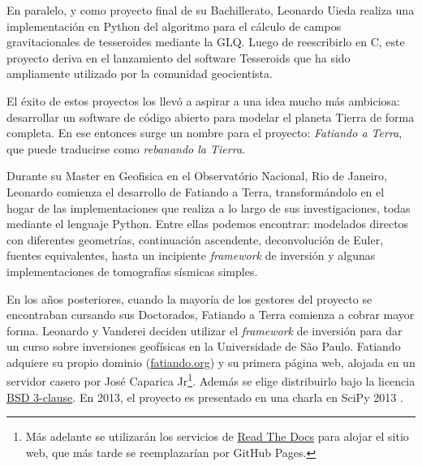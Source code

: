 En paralelo, y como proyecto final de su Bachillerato, Leonardo Uieda realiza
una implementación en Python del algoritmo para el cálculo de campos
gravitacionales de tesseroides mediante la \ac{GLQ}.
Luego de reescribirlo en C, este proyecto deriva en el lanzamiento del software
Tesseroids \citep{uieda2016} que ha sido ampliamente utilizado por la comunidad
geocientista.

El éxito de estos proyectos los llevó a aspirar a una idea mucho más
ambiciosa: desarrollar un software de código abierto para modelar el planeta
Tierra de
forma completa.
En ese entonces surge un nombre para el proyecto: \emph{Fatiando a Terra}, que
puede traducirse como \emph{rebanando la Tierra}.

Durante su Master en Geofisica en el Observatório Nacional, Rio de Janeiro,
Leonardo comienza el desarrollo de Fatiando a Terra, transformándolo en el hogar
de las implementaciones que realiza a lo largo de sus investigaciones, todas
mediante el lenguaje Python.
Entre ellas podemos encontrar: modelados directos con diferentes geometrías,
continuación ascendente, deconvolución de Euler, fuentes equivalentes, hasta un
incipiente \emph{framework} de inversión y algunas implementaciones de
tomografías sísmicas simples.

En los años posteriores, cuando la mayoría de los gestores del proyecto se
encontraban cursando sus Doctorados, Fatiando a Terra comienza a cobrar mayor
forma.
Leonardo y Vanderei deciden utilizar el \emph{framework} de inversión para dar
un curso sobre inversiones geofísicas en la Universidade de São Paulo.
Fatiando adquiere su propio dominio
(\href{https://www.fatiando.org}{fatiando.org}) y su primera página web,
alojada en un servidor casero por José Caparica Jr\footnote{%
    Más adelante se utilizarán los servicios de
    \href{https://readthedocs.org/}{Read The Docs} para alojar el sitio web,
    que más tarde se reemplazarían por GitHub Pages.
}.
Además se elige distribuirlo bajo la licencia
\href{https://opensource.org/licenses/BSD-3-Clause}{BSD 3-clause}.
En 2013, el proyecto es presentado en una charla en SciPy 2013
\citep{uieda2013}.

